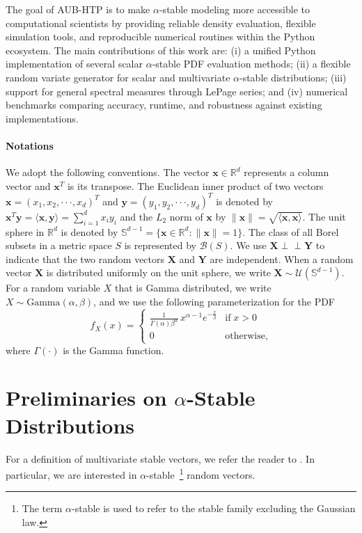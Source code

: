 The goal of AUB-HTP is to make $\alpha$-stable modeling more accessible to computational scientists by providing reliable density evaluation, flexible simulation tools, and reproducible numerical routines within the Python ecosystem. The main contributions of this work are: (i) a unified Python implementation of several scalar $\alpha$-stable PDF evaluation methods; (ii) a flexible random variate generator for scalar and multivariate $\alpha$-stable distributions; (iii) support for general spectral measures through LePage series; and (iv) numerical benchmarks comparing accuracy, runtime, and robustness against existing implementations.

\paragraph*{Notations}
\label{sect:notations}
We adopt the following conventions. The vector $\mathbf{x}\in\mathbb{R}^d$ represents a column vector and $\mathbf{x}^T$ is its transpose. The Euclidean inner product of two vectors  $\mathbf{x} = (x_1,x_2,\cdot\cdot\cdot,x_d)^T$ and $\mathbf{y} = (y_1,y_2,\cdot\cdot\cdot,y_d)^T$ is denoted by $\mathbf{x}^T\mathbf{y}=⟨\mathbf{x},\mathbf{y}⟩=\sum_{i=1}^{d}x_iy_i $ and the $L_2$ norm of $\mathbf{x}$ by $\|\mathbf{x}\|=\sqrt{⟨\mathbf{x},\mathbf{x}⟩}$. The unit sphere in $\mathbb{R}^d$ is denoted by $\mathbb{S}^{d-1}=\{\mathbf{x}\in\mathbb{R}^d: \|\mathbf{x}\|=1\}$. The class of all Borel subsets in a metric space $S$ is represented by $\mathcal{B}(S)$. We use $\mathbf{X} \perp\!\!\!\perp \mathbf{Y}$ to indicate that the two random vectors $\mathbf{X}$ and $\mathbf{Y}$ are independent. When a random vector $\mathbf{X}$ is distributed uniformly on the unit sphere, we write $\mathbf{X}\sim\mathcal{U}(\mathbb{S}^{d-1})$. For a random variable $X$ that is Gamma distributed, we write $X\sim\text{Gamma}(\alpha,\beta)$, and we use the following parameterization for the PDF \begin{equation*}
    f_{X}(x)=\begin{cases}
        \displaystyle \frac{1}{\Gamma(\alpha)\beta^{\alpha}} \, x^{\alpha-1} e^{-\frac{x}{\beta}} & \text{if}\; x>0\\
        0 & \text{otherwise},
    \end{cases}
\end{equation*}
where $\Gamma(\cdot)$ is the Gamma function.

\section{Preliminaries on $\alpha$-Stable Distributions}
For a definition of multivariate stable vectors, we refer the reader to \cite[Definition 2.1.1]{SamorodnitskyGennady2000Snrp}. In particular, we are interested in $\alpha$-stable~\footnote{The term $\alpha$-stable is used to refer to the stable family excluding the Gaussian law.} random vectors.


